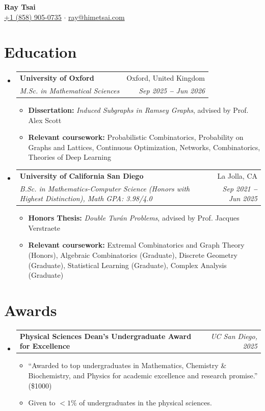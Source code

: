 \documentclass[letterpaper,11pt]{article}
\makeatletter
\newcommand{\resumeItem}[1]{
  \item\small{
    {#1 \vspace{-1pt}}
  }
}
\newcommand{\resumeSubSubheading}[2]{
    \vspace{-2pt}\item
    \begin{tabular*}{0.97\textwidth}{l@{\extracolsep{\fill}}r}
      \textbf{\small#1} & \textit{\small #2} \\
    \end{tabular*}\vspace{-5pt}
}
\newcommand{\resumeEducationHeading}[4]{
  \vspace{-2pt}\item
    \begin{tabular*}{0.97\textwidth}[t]{l@{\extracolsep{\fill}}r}
      \textbf{#1} & #2 \\
      \textit{\small#3} & \textit{\small #4} \\
    \end{tabular*}\vspace{-5pt}
}
\newcommand{\resumeSubHeadingListStart}{\begin{itemize}[leftmargin=0.15in, label={}]}
\newcommand{\resumeSubHeadingListEnd}{\end{itemize}}
\newcommand{\resumeItemListStart}{\begin{itemize}\vspace{-2pt}}
\newcommand{\resumeItemListEnd}{\end{itemize}\vspace{-7pt}}
\makeatother
\begin{document}

\begin{center}
  \textbf{\Huge Ray Tsai} \\
  \vspace{8pt}
  \small
  \href{tel:18589050735}{+1 (858) 905-0735}
  $\cdot$
  \href{mailto:ray@himetsai.com}{ray@himetsai.com}
\end{center}


\section{Education}
\resumeSubHeadingListStart

  \resumeEducationHeading{University of Oxford}{Oxford, United Kingdom}{M.Sc. in Mathematical Sciences}{Sep 2025 \textbf{--} Jun 2026}
  \resumeItemListStart
    \resumeItem{\textbf{Dissertation:} \textit{Induced Subgraphs in Ramsey Graphs}, advised by Prof. Alex Scott}
    \resumeItem{\textbf{Relevant coursework:} Probabilistic Combinatorics, Probability on Graphs and Lattices, Continuous Optimization, Networks, Combinatorics, Theories of Deep Learning}
  \resumeItemListEnd

  \vspace{3pt}

  \resumeEducationHeading{University of California San Diego}{La Jolla, CA}{B.Sc. in Mathematics-Computer Science (Honors with Highest Distinction), Math GPA: 3.98/4.0}{Sep 2021 \textbf{--} Jun 2025}
  \resumeItemListStart
    \resumeItem{\textbf{Honors Thesis:} \textit{Double Turán Problems}, advised by Prof. Jacques Verstraete}
    \resumeItem{\textbf{Relevant coursework:} Extremal Combinatorics and Graph Theory (Honors), Algebraic Combinatorics (Graduate), Discrete Geometry (Graduate), Statistical Learning (Graduate), Complex Analysis (Graduate)}
  \resumeItemListEnd

\resumeSubHeadingListEnd


\section{Awards}
\resumeSubHeadingListStart
  \resumeSubSubheading{Physical Sciences Dean's Undergraduate Award for Excellence}{UC San Diego, 2025}
  \resumeItemListStart
    \resumeItem{``Awarded to top undergraduates in Mathematics, Chemistry \& Biochemistry, and Physics for academic excellence and research promise.'' (\$1000)}
    \resumeItem{Given to $<1\%$ of undergraduates in the physical sciences.}
  \resumeItemListEnd
\resumeSubHeadingListEnd
\end{document}

